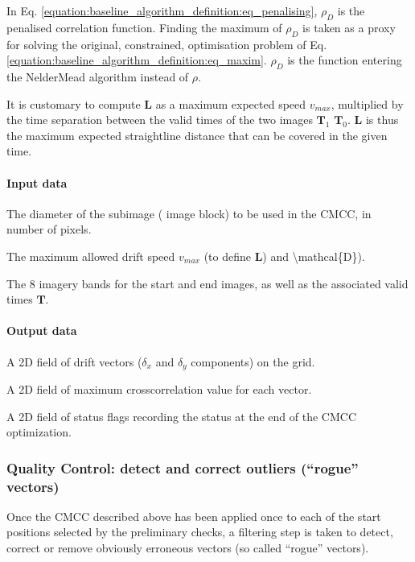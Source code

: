 \documentclass[letterpaper,10pt,english]{jupyterBook}
\begin{document}
\sphinxAtStartPar
In Eq. \eqref{equation:baseline_algorithm_definition:eq_penalising}, \(\rho_D\) is the penalised correlation function. Finding the maximum
of \(\rho_D\) is taken as a proxy for solving the original, constrained,
optimisation problem of Eq. \eqref{equation:baseline_algorithm_definition:eq_maxim}. \(\rho_D\) is the function entering the Nelder\sphinxhyphen{}Mead
algorithm instead of \(\rho\).

\sphinxAtStartPar
It is customary to compute \(\mathbf{L}\) as a maximum expected speed
\(v_{max}\), multiplied by the time separation between the valid times of the two images
\(\mathbf{T}_1\) \sphinxhyphen{} \(\mathbf{T}_0\). \(\mathbf{L}\) is thus the maximum
expected straight\sphinxhyphen{}line distance that can be covered in the given time.


\paragraph{Input data}
\label{\detokenize{baseline_algorithm_definition:id16}}
\sphinxAtStartPar
The diameter of the sub\sphinxhyphen{}image ( image block) to be used in the CMCC, in number of pixels.

\sphinxAtStartPar
The maximum allowed drift speed \(v_{max}\) (to define \(\mathbf{L}\)) and \textbackslash{}mathcal\{D\}).

\sphinxAtStartPar
The 8 imagery bands for the start and end images, as well as the associated valid times \(\mathbf{T}\).


\paragraph{Output data}
\label{\detokenize{baseline_algorithm_definition:id17}}
\sphinxAtStartPar
A 2D field of drift vectors (\(\delta_x\) and \(\delta_y\) components) on the  grid.

\sphinxAtStartPar
A 2D field of maximum cross\sphinxhyphen{}correlation value for each vector.

\sphinxAtStartPar
A 2D field of status flags recording the status at the end of the CMCC optimization.


\subsubsection{Quality Control: detect and correct outliers (“rogue” vectors)}
\label{\detokenize{baseline_algorithm_definition:quality-control-detect-and-correct-outliers-rogue-vectors}}
\sphinxAtStartPar
Once the CMCC described above has been applied once to each of the
start positions selected by the preliminary checks, a filtering step
is taken to detect, correct or remove obviously erroneous vectors (so called “rogue” vectors).
\end{document}
